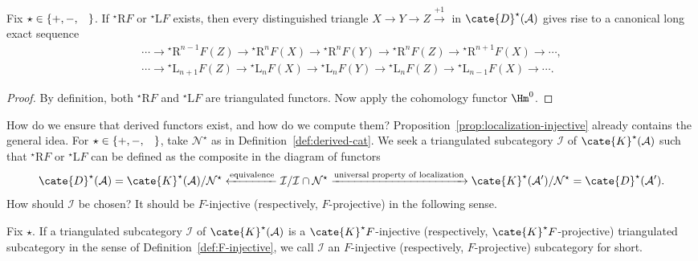 \begin{theorem}\label{prop:derived-long-exact}
	Fix $\star\in\{+,-,\hspace{0.8em}\}$. If
	${}^\star\mathrm{R}F$ or ${}^\star\mathrm{L}F$ exists, then every
	distinguished triangle $X\to Y\to Z\xrightarrow{+1}$ in
	$\cate{D}^\star(\mathcal{A})$ gives rise to a canonical long exact sequence
	\begin{gather*}
		\cdots \to {}^\star \mathrm{R}^{n-1} F(Z) \to {}^\star \mathrm{R}^n F(X) \to {}^\star \mathrm{R}^n F(Y) \to {}^\star \mathrm{R}^n F(Z) \to {}^\star \mathrm{R}^{n+1} F(X) \to \cdots , \\
		\cdots \to {}^\star \mathrm{L}_{n+1} F(Z) \to {}^\star \mathrm{L}_n F(X) \to {}^\star \mathrm{L}_n F(Y) \to {}^\star \mathrm{L}_n F(Z) \to {}^\star \mathrm{L}_{n-1} F(X) \to \cdots .
	\end{gather*}
\end{theorem}
\begin{proof}
	By definition, both ${}^\star\mathrm{R}F$ and
	${}^\star\mathrm{L}F$ are triangulated functors. Now apply the cohomology
	functor $\Hm^0$.
\end{proof}

How do we ensure that derived functors exist, and how do we compute them?
Proposition~\ref{prop:localization-injective} already contains the general
idea. For $\star\in\{+,-,\hspace{0.8em}\}$, take $\mathcal{N}^\star$ as in
Definition~\ref{def:derived-cat}. We seek a triangulated subcategory
$\mathcal{I}$ of $\cate{K}^\star(\mathcal{A})$ such that
${}^\star\mathrm{R}F$ or ${}^\star\mathrm{L}F$ can be defined as the
composite in the diagram of functors
\[ \cate{D}^\star(\mathcal{A}) = \cate{K}^\star(\mathcal{A})/\mathcal{N}^\star \xleftarrow{\text{equivalence}} \mathcal{I}/\mathcal{I} \cap \mathcal{N}^\star \xrightarrow{\text{universal property of localization}} \cate{K}^\star(\mathcal{A}')/\mathcal{N}^\star = \cate{D}^\star(\mathcal{A}') . \]
How should $\mathcal{I}$ be chosen? It should be $F$-injective (respectively,
$F$-projective) in the following sense.

\begin{convention}
	Fix $\star$. If a triangulated subcategory $\mathcal{I}$ of
	$\cate{K}^\star(\mathcal{A})$ is a $\cate{K}^\star F$-injective
	(respectively, $\cate{K}^\star F$-projective) triangulated subcategory in
	the sense of Definition~\ref{def:F-injective}, we call $\mathcal{I}$ an
	$F$-injective (respectively, $F$-projective) subcategory for short.
\end{convention}

